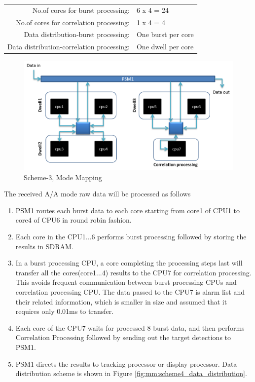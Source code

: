 \begin{tabular}{rl}
	No.of cores for burst processing: & 6 x 4 = 24 \\
	No.of cores for correlation processing: & 1 x 4 = 4 \\
	Data distribution-burst processing: & One burst per core \\
	Data distribution-correlation processing: & One dwell per core \\
\end{tabular}

\begin{figure}[h!]
	\centering
	\includegraphics[width=140mm]{figures/scheme4_aa_mode_mapping}
	\caption{Scheme-3, Mode Mapping}
	\label{fig:mm:scheme4_aa_mode_mapping}
\end{figure}

\vspace*{0.2cm}
\noindent
The received A/A mode raw data will be processed as follows

\begin{enumerate}
\item PSM1 routes each burst data to each core starting from core1 of CPU1 to core4 of CPU6 in round robin fashion.
\item Each core in the CPU1...6 performs burst processing followed by storing the results in SDRAM.
\item In a burst processing CPU, a core completing the processing steps last will transfer all the cores(core1...4) results to the CPU7 for correlation processing. This avoids frequent communication between burst processing CPUs and correlation processing CPU. The data passed to the CPU7 is alarm list and their related information, which is smaller in size and assumed that it requires only 0.01ms to transfer.
\item Each core of the CPU7 waits for processed 8 burst data, and then performs Correlation Processing followed by sending out the target detections to PSM1.
\item PSM1 directs the results to tracking processor or display processor. Data distribution scheme is shown in Figure \ref{fig:mm:scheme4_data_distribution}.
\end{enumerate}

